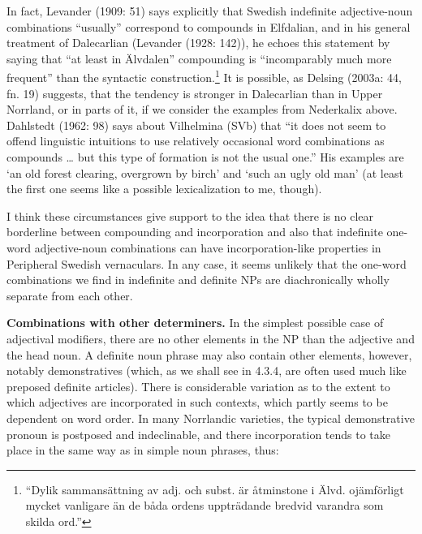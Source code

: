 In fact, Levander (1909: 51) says explicitly that Swedish indefinite adjective-noun combinations “usually” correspond to compounds in Elfdalian, and in his general treatment of Dalecarlian (Levander (1928: 142)), he echoes this statement by saying that “at least in Älvdalen” compounding is “incomparably much more frequent” than the syntactic construction.\footnote{ “Dylik sammansättning av adj. och subst. är åtminstone i Älvd. ojämförligt mycket vanligare än de båda ordens uppträdande bredvid varandra som skilda ord.”} It is possible, as Delsing (2003a: 44, fn. 19) suggests, that the tendency is stronger in Dalecarlian than in Upper Norrland, or in parts of it, if we consider the examples from Nederkalix above. Dahlstedt (1962: 98) says about Vilhelmina (SVb) that “it does not seem to offend linguistic intuitions to use relatively occasional word combinations as compounds … but this type of formation is not the usual one.” His examples are  ‘an old forest clearing, overgrown by birch’ and ‘such an ugly old man’ (at least the first one seems like a possible lexicalization to me, though). 

I think these circumstances give support to the idea that there is no clear borderline between compounding and incorporation and also that indefinite one-word adjective-noun combinations can have incorporation-like properties in Peripheral Swedish vernaculars. In any case, it seems unlikely that the one-word combinations we find in indefinite and definite NPs are diachronically wholly separate from each other.

\textbf{Combinations with other determiners. }In the simplest possible case of adjectival modifiers, there are no other elements in the NP than the adjective and the head noun. A definite noun phrase may also contain other elements, however, notably demonstratives (which, as we shall see in 4.3.4, are often used much like preposed definite articles). There is considerable variation as to the extent to which adjectives are incorporated in such contexts, which partly seems to be dependent on word order. In many Norrlandic varieties, the typical demonstrative pronoun is postposed and indeclinable, and there incorporation tends to take place in the same way as in simple noun phrases, thus:


